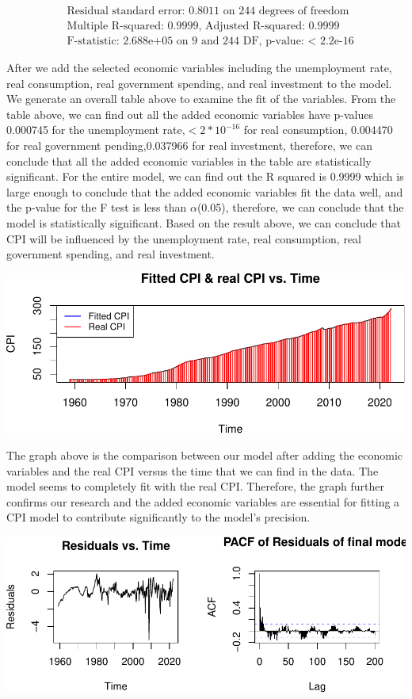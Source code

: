 \documentclass[
  man,floatsintext,
  man]{apa6}
\begin{document}
\[
\begin{aligned}
&\text{Residual standard error: 0.8011 on 244 degrees of freedom} \\
&\text{Multiple R-squared: 0.9999, Adjusted R-squared: 0.9999} \\
&\text{F-statistic: 2.688e+05 on 9 and 244 DF, p-value: < 2.2e-16}
\end{aligned}
\]

After we add the selected economic variables including the unemployment rate, real consumption, real government spending, and real investment to the model. We generate an overall table above to examine the fit of the variables. From the table above, we can find out all the added economic variables have p-values 0.000745 for the unemployment rate,\(<2*10^{-16}\) for real consumption, 0.004470 for real government pending,0.037966 for real investment, therefore, we can conclude that all the added economic variables in the table are statistically significant. For the entire model, we can find out the R squared is 0.9999 which is large enough to conclude that the added economic variables fit the data well, and the p-value for the F test is less than \(\alpha\)(0.05), therefore, we can conclude that the model is statistically significant. Based on the result above, we can conclude that CPI will be influenced by the unemployment rate, real consumption, real government spending, and real investment.

\includegraphics{stat429_group2_final_proj_files/figure-latex/unnamed-chunk-5-1.pdf}

The graph above is the comparison between our model after adding the economic variables and the real CPI versus the time that we can find in the data. The model seems to completely fit with the real CPI. Therefore, the graph further confirms our research and the added economic variables are essential for fitting a CPI model to contribute significantly to the model's precision.

\includegraphics{stat429_group2_final_proj_files/figure-latex/unnamed-chunk-6-1.pdf}
\end{document}
